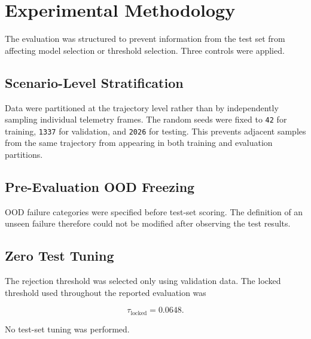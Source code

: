 \documentclass[conference]{IEEEtran}
\begin{document}
\section{Experimental Methodology}

The evaluation was structured to prevent information from the test set from
affecting model selection or threshold selection. Three controls were applied.

\subsection{Scenario-Level Stratification}

Data were partitioned at the trajectory level rather than by independently
sampling individual telemetry frames. The random seeds were fixed to
\texttt{42} for training, \texttt{1337} for validation, and \texttt{2026}
for testing. This prevents adjacent samples from the same trajectory from
appearing in both training and evaluation partitions.

\subsection{Pre-Evaluation OOD Freezing}

OOD failure categories were specified before test-set scoring. The definition
of an unseen failure therefore could not be modified after observing the test
results.

\subsection{Zero Test Tuning}

The rejection threshold was selected only using validation data. The locked
threshold used throughout the reported evaluation was

\begin{equation}
\tau_{\mathrm{locked}}=0.0648.
\end{equation}

No test-set tuning was performed.
\end{document}
